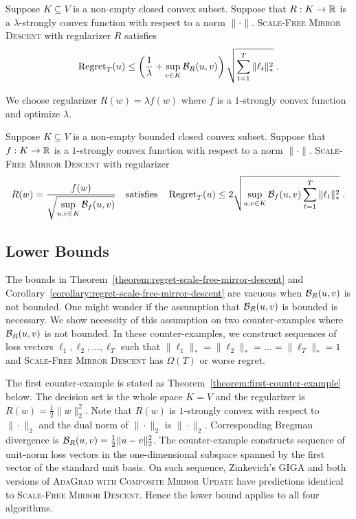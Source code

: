 \begin{theorem}
\label{theorem:regret-scale-free-mirror-descent}
Suppose $K \subseteq V$ is a non-empty closed convex subset. Suppose
that $R:K \to \mathbb{R}$ is a $\lambda$-strongly convex function with respect to a norm $\|\cdot\|$.
\textsc{Scale-Free Mirror Descent} with regularizer $R$ satisfies
$$
\operatorname{Regret}_T(u) \le \left( \frac{1}{\lambda} + \sup_{v \in K} \mathcal{B}_R(u,v) \right) \sqrt{\sum_{t=1}^T \|\ell_t\|_*^2} \; .
$$
\end{theorem}

We choose regularizer $R(w) = \lambda f(w)$ where $f$ is a $1$-strongly convex function
and optimize $\lambda$.

\begin{corollary}
\label{corollary:regret-scale-free-mirror-descent}
Suppose $K \subseteq V$ is a non-empty bounded closed convex subset.  Suppose
that $f:K \to \mathbb{R}$ is a $1$-strongly convex function with respect to a norm $\|\cdot\|$.
\textsc{Scale-Free Mirror Descent} with regularizer
$$
R(w) = \frac{f(w)}{\displaystyle \sqrt{\sup_{u,v \in K} \Breg_f(u,v)}}
\quad \text{satisfies} \quad %
\Regret_T(u) \le 2 \sqrt{\sup_{u,v \in K} \Breg_f(u,v) \sum_{t=1}^T \|\ell_t\|_*^2} \; .
$$
\end{corollary}

\subsection{Lower Bounds}

The bounds in Theorem~\ref{theorem:regret-scale-free-mirror-descent} and
Corollary~\ref{corollary:regret-scale-free-mirror-descent} are vacuous when
$\mathcal{B}_R(u,v)$ is not bounded. One might wonder if the
assumption that $\mathcal{B}_R(u,v)$ is bounded is necessary. We show necessity of
this assumption on two counter-examples where $\mathcal{B}_R(u,v)$ is not bounded.
In these counter-examples, we construct sequences of loss vectors $\ell_1,
\ell_2, \dots, \ell_T$ such that $\|\ell_1\|_* = \|\ell_2\|_* = \dots =
\|\ell_T\|_* = 1$ and \textsc{Scale-Free Mirror Descent} has $\Omega(T)$
or worse regret.

The first counter-example is stated as
Theorem~\ref{theorem:first-counter-example} below. The decision set is the
whole space $K=V$ and the regularizer is $R(w) = \frac{1}{2}\|w\|_2^2$. Note
that $R(w)$ is $1$-strongly convex with respect to $\|\cdot\|_2$ and the dual
norm of $\|\cdot\|_2$ is $\|\cdot\|_2$. Corresponding Bregman divergence is
$\mathcal{B}_R(u,v) = \frac{1}{2}\|u-v\|_2^2$. The counter-example constructs
sequence of unit-norm loss vectors in the one-dimensional subspace spanned by
the first vector of the standard unit basis.  On such sequence, Zinkevich's
\textsc{GIGA} and both versions of \textsc{AdaGrad with Composite Mirror Update} have
predictions identical to \textsc{Scale-Free Mirror Descent}. Hence the lower
bound applies to all four algorithms.

